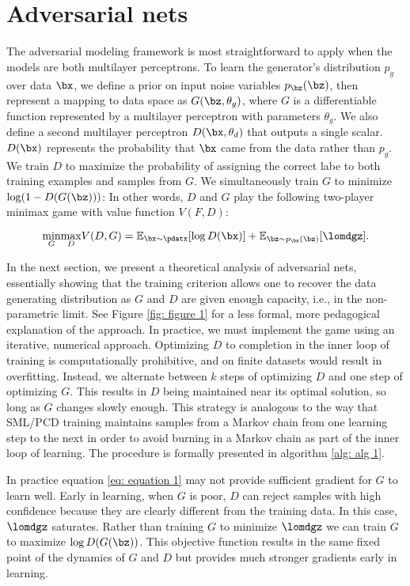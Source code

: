 \section{Adversarial nets}

The adversarial modeling framework is most straightforward to apply when the models are both
multilayer perceptrons. To learn the generator’s distribution $p_g$ over data $\bx$, we define a prior on input noise variables $p_{\bz}(\bz)$, then represent a mapping to data space as $G(\bz, \theta_g)$, where $G$ is a differentiable function represented by a multilayer perceptron with parameters $\theta_g$. We also define a second multilayer perceptron $D(\bx, \theta_d)$ that outputs a single scalar. $D(\bx)$ represents the probability that $\bx$ came from the data rather than $p_g$. We train $D$ to maximize the probability of assigning the correct labe to both training examples and samples from $G$. We simultaneously train $G$ to minimize $\log(1-D(G(\bz)))$:
In other words, $D$ and $G$ play the following two-player minimax game with value function $V(F,D)$:

\begin{equation}
	\underset{G}{\min} \underset{D}{\max} V(D,G) = \mathbb{E}_{\bx\sim \pdatx}[\log D(\bx)]+\mathbb{E}_{\bz\sim p_{\bz}(\bz)}[\lomdgz].\label{eq: equation 1}
\end{equation}

In the next section, we present a theoretical analysis of adversarial nets, essentially showing that the training criterion allows one to recover the data generating distribution as $G$ and $D$ are given enough capacity, i.e., in the non-parametric limit. See Figure \ref{fig: figure 1} for a less formal, more pedagogical explanation of the approach. In practice, we must implement the game using an iterative, numerical approach. Optimizing $D$ to completion in the inner loop of training is computationally prohibitive, and on finite datasets would result in overfitting. Instead, we alternate between $k$ steps of optimizing $D$ and one step of optimizing $G$. This results in $D$ being maintained near its optimal solution, so long as $G$ changes slowly enough. This strategy is analogous to the way that SML/PCD \cite{31_younes1999convergence,29_10.1145/1390156.1390290} training maintains samples from a Markov chain from one learning step to the next in order to avoid burning in a Markov chain as part of the inner loop of learning. The procedure is formally presented in algorithm \ref{alg: alg 1}.



\noindent In practice equation \ref{eq: equation 1} may not provide sufficient gradient for $G$ to learn well. Early in learning, when $G$ is poor, $D$ can reject samples with high confidence because they are clearly different from the training data. In this case, $\lomdgz$ saturates. Rather than training $G$ to minimize $\lomdgz$ we can train $G$ to maximize $\log D(G(\bz))$. This objective function results in the same fixed point of the dynamics of $G$ and $D$ but provides much stronger gradients early in learning.
